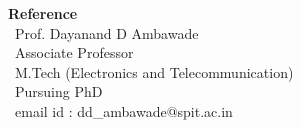 \documentclass[12pt]{article}
\begin{document}
\begin{flushleft}
\vspace{5mm}
\textbf{Reference}\\
\vspace{5mm}
\ Prof. Dayanand D Ambawade\\
\ Associate Professor \\
\ M.Tech (Electronics and Telecommunication)\\
\ Pursuing PhD\\
\ email id : dd\_ambawade@spit.ac.in\\
\vspace{5mm}
\end{flushleft}
\end{document}
